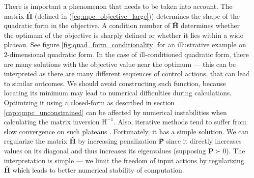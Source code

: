 There is important a phenomenon that needs to be taken into account. The matrix \textbf{\^H} (defined in (\ref{eq:mpc_objective_large})) determines the shape of the quadratic form in the objective. A condition number of \textbf{\^H} determines whether the optimum of the objective is sharply defined or whether it lies within a wide plateau. See figure \ref{fig:quad_form_conditionality} for an illustrative example on 2-dimensional quadratic form. In the case of ill-conditioned quadratic form, there are many solutions with the objective value near the optimum --- this can be interpreted as there are many different sequences of control actions, that can lead to similar outcomes. We should avoid constructing such function, because locating its minimum may lead to numerical difficulties during calculations. Optimizing it using a closed-form as described in section \ref{cap:qmpc_unconstrained} can be affected by numerical instabilities when calculating the matrix inversion $\textbf{\^H}^{-1}$. Also, iterative methods tend to suffer from slow convergence on such plateaus \citep{boyd2004convex}. Fortunately, it has a simple solution. We can regularize the matrix \textbf{\^H} by increasing penalization \textbf{\^P} since it directly increases values on its diagonal and thus increases its eigenvalues (supposing $\textbf{\^P} \succ 0$). The interpretation is simple --- we limit the freedom of input actions by regularizing \textbf{\^H} which leads to better numerical stability of computation.

